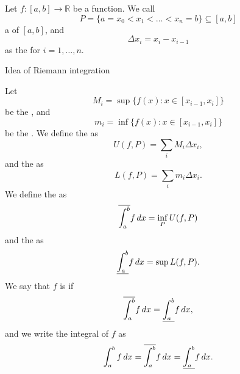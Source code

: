 \documentclass[notoc,notitlepage]{tufte-book}
\begin{document}
\begin{defnnonum}\label{defn:riemann_integration}
  Let $f : [a, b] \to \mathbb{R}$ be a  function.
  We call
  \begin{equation*}
    P = \{ a = x_0 < x_1 < \hdots < x_n = b \} \subseteq [a, b]
  \end{equation*}
  a  of $[a, b]$,
  and
  \begin{equation*}
    \Delta x_i = x_i - x_{i-1}
  \end{equation*}
  as the 
  for $i = 1, \ldots, n$.
  \begin{marginfigure}
    \centering
    \caption{Idea of Riemann integration}\label{fig:idea_of_riemann_integration}
  \end{marginfigure}
  Let
  \begin{equation*}
    M_i = \sup \{ f(x) : x \in [x_{i-1}, x_i] \}
  \end{equation*}
  be the ,
  and 
  \begin{equation*}
    m_i = \inf \{ f(x) : x \in [x_{i-1}, x_i] \}
  \end{equation*}
  be the .
  We define the  as
  \begin{equation*}
    U(f, P) = \sum_{i} M_i \Delta x_i,
  \end{equation*}
  and the  as
  \begin{equation*}
    L(f, P) = \sum_{i} m_i \Delta x_i. 
  \end{equation*}
  We define the  as
  \begin{equation*}
    \overline{\int_{a}^{b}} f \mathop{}\!d{x} = \inf_{P} U(f, P)
  \end{equation*}
  and the  as
  \begin{equation*}
    \underline{\int_{a}^{b}} f \mathop{}\!d{x} = \sup L(f, P).
  \end{equation*}
  We say that $f$ is  if
  \begin{equation*}
    \overline{\int_{a}^{b}} f \mathop{}\!d{x}
    = \underline{\int_{a}^{b}} f \mathop{}\!d{x},
  \end{equation*}
  and we write the integral of $f$ as
  \begin{equation*}
    \int_{a}^{b} f \mathop{}\!d{x}
    = \overline{\int_{a}^{b}} f \mathop{}\!d{x}
    = \underline{\int_{a}^{b}} f \mathop{}\!d{x}.
  \end{equation*}
\end{defnnonum}
\end{document}
